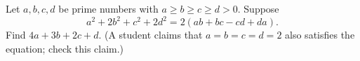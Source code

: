 Let $a,b,c,d$ be prime numbers with $a\ge b\ge c\ge d>0$. Suppose
\[
a^2+2b^2+c^2+2d^2=2(ab+bc-cd+da).
\]
Find $4a+3b+2c+d$. (A student claims that $a=b=c=d=2$ also satisfies the equation; check this claim.)
